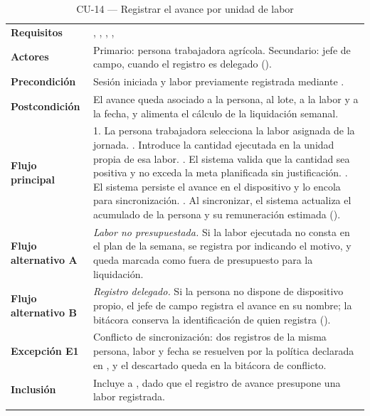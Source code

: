 \begin{longtable}{|L{3.4cm}|L{12.0cm}|}
\hline
{}\\
\hline
\textbf{Requisitos} & , , , ,  \\ \hline
\textbf{Actores} & Primario: persona trabajadora agrícola. Secundario: jefe de campo, cuando el registro es delegado (). \\ \hline
\textbf{Precondición} & Sesión iniciada y labor previamente registrada mediante . \\ \hline
\textbf{Postcondición} & El avance queda asociado a la persona, al lote, a la labor y a la fecha, y alimenta el cálculo de la liquidación semanal. \\ \hline
\textbf{Flujo principal} & 1. La persona trabajadora selecciona la labor asignada de la jornada. . Introduce la cantidad ejecutada en la unidad propia de esa labor. . El sistema valida que la cantidad sea positiva y no exceda la meta planificada sin justificación. . El sistema persiste el avance en el dispositivo y lo encola para sincronización. . Al sincronizar, el sistema actualiza el acumulado de la persona y su remuneración estimada (). \\ \hline
\textbf{Flujo alternativo A} & \emph{Labor no presupuestada.} Si la labor ejecutada no consta en el plan de la semana, se registra por  indicando el motivo, y queda marcada como fuera de presupuesto para la liquidación. \\ \hline
\textbf{Flujo alternativo B} & \emph{Registro delegado.} Si la persona no dispone de dispositivo propio, el jefe de campo registra el avance en su nombre; la bitácora conserva la identificación de quien registra (). \\ \hline
\textbf{Excepción E1} & Conflicto de sincronización: dos registros de la misma persona, labor y fecha se resuelven por la política declarada en , y el descartado queda en la bitácora de conflicto. \\ \hline
\textbf{Inclusión} & Incluye a , dado que el registro de avance presupone una labor registrada. \\ \hline
\caption{CU-14 --- Registrar el avance por unidad de labor}
\end{longtable}

